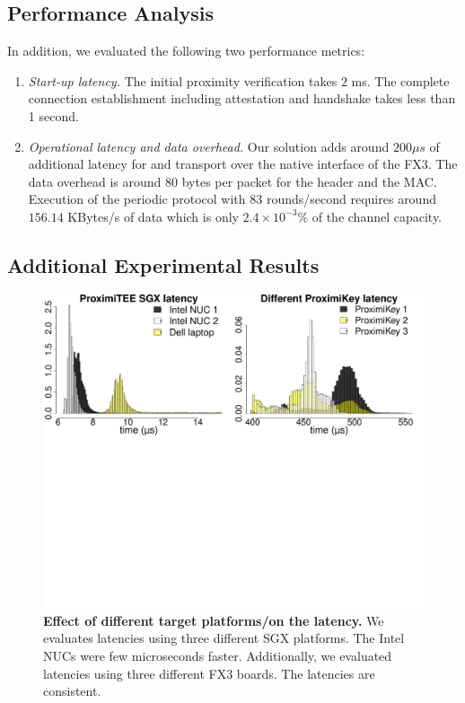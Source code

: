 \subsection{Performance Analysis}

In addition, we evaluated the following two performance metrics:

\begin{enumerate}
  \item \emph{Start-up latency.} The initial proximity verification takes $2$ ms. The complete connection establishment including attestation and \tls handshake takes less than 1 second.  
  


  \item \emph{Operational latency and data overhead.} Our solution adds around $200 \mu s$ of additional latency for \tls and transport over the native \usb interface of the FX3. The data overhead is around 80 bytes per packet for the header and the MAC. Execution of the periodic \name protocol with $83$ rounds/second requires around $156.14$ KBytes/s of data which is only $2.4 \times 10^{-3}$\% of the  channel capacity. 


\end{enumerate}


\subsection{Additional Experimental Results}


\begin{figure}[t]
  \centering
    \includegraphics[trim={0 18cm 0 0}, clip, width=\linewidth]{chapters/ProximiTEE/data/graph/PlatformDevice_1.pdf}
    \caption[Effect of different target platforms/\device on the latency.]{\textbf{Effect of different target platforms/\device on the latency.} We evaluates latencies using three different SGX platforms. The Intel NUCs were few microseconds faster. Additionally, we evaluated latencies using three different FX3 boards. The latencies are consistent.}
    \label{graph:sgxLatency}
\end{figure}

